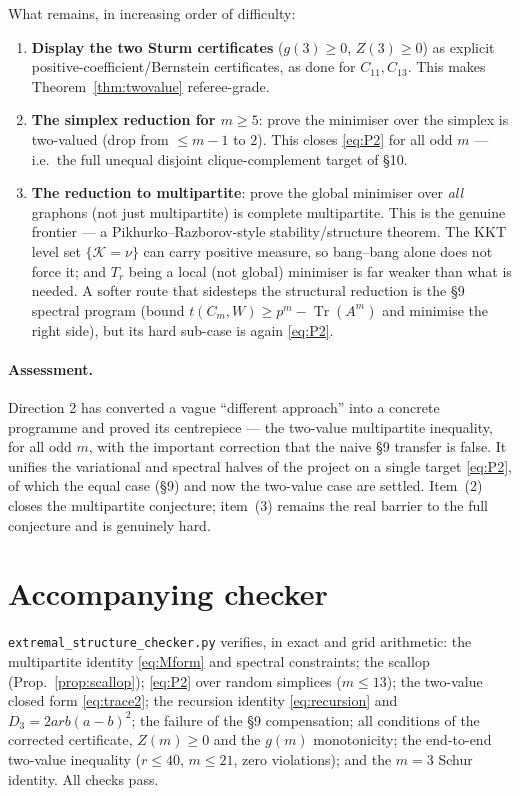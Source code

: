 \documentclass[11pt]{article}
\theoremstyle{remark}
\newcommand{\Tr}{\operatorname{Tr}}
\begin{document}
What remains, in increasing order of difficulty:
\begin{enumerate}[leftmargin=2em]
\item \textbf{Display the two Sturm certificates} ($g(3)\ge0$, $Z(3)\ge0$) as explicit positive-coefficient/Bernstein certificates, as done for $C_{11},C_{13}$.  This makes Theorem~\ref{thm:twovalue} referee-grade.
\item \textbf{The simplex reduction for $m\ge5$}: prove the minimiser over the simplex is two-valued (drop from $\le m-1$ to $2$).  This closes \eqref{eq:P2} for all odd $m$ --- i.e.\ the full unequal disjoint clique-complement target of \S10.
\item \textbf{The reduction to multipartite}: prove the global minimiser over \emph{all} graphons (not just multipartite) is complete multipartite.  This is the genuine frontier --- a Pikhurko--Razborov-style stability/structure theorem.  The KKT level set $\{\mathcal K=\nu\}$ can carry positive measure, so bang--bang alone does not force it; and $T_r$ being a local (not global) minimiser is far weaker than what is needed.  A softer route that sidesteps the structural reduction is the \S9 spectral program (bound $t(C_m,W)\ge p^m-\Tr(A^m)$ and minimise the right side), but its hard sub-case is again \eqref{eq:P2}.
\end{enumerate}

\paragraph{Assessment.}
Direction 2 has converted a vague ``different approach'' into a concrete programme and proved its centrepiece --- the two-value multipartite inequality, for all odd $m$, with the important correction that the naive \S9 transfer is false.  It unifies the variational and spectral halves of the project on a single target \eqref{eq:P2}, of which the equal case (\S9) and now the two-value case are settled.  Item~(2) closes the multipartite conjecture; item~(3) remains the real barrier to the full conjecture and is genuinely hard.

\section*{Accompanying checker}

\texttt{extremal\_structure\_checker.py} verifies, in exact and grid arithmetic: the multipartite identity \eqref{eq:Mform} and spectral constraints; the scallop (Prop.~\ref{prop:scallop}); \eqref{eq:P2} over random simplices ($m\le13$); the two-value closed form \eqref{eq:trace2}; the recursion identity \eqref{eq:recursion} and $D_3=2arb(a-b)^2$; the failure of the \S9 compensation; all conditions of the corrected certificate, $Z(m)\ge0$ and the $g(m)$ monotonicity; the end-to-end two-value inequality ($r\le40$, $m\le21$, zero violations); and the $m=3$ Schur identity.  All checks pass.
\end{document}
